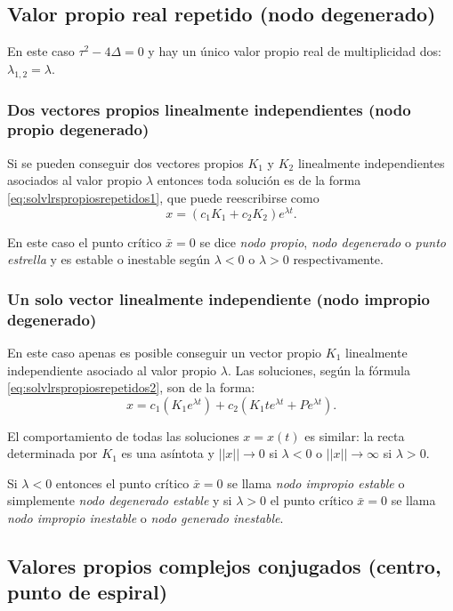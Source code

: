 \documentclass[11pt]{book}
\theoremstyle{definition}
\numberwithin{definition}{section}
\theoremstyle{theorem}
\numberwithin{theorem}{section}
\numberwithin{lemma}{section}
\numberwithin{corollary}{section}
\theoremstyle{plain}
\numberwithin{example}{section}
\begin{document}

\subsection{Valor propio real repetido (nodo degenerado)}

En este caso $\tau^2 - 4\Delta = 0$ y hay un único valor propio real de multiplicidad dos: $\lambda_{1,2} = \lambda$.

\subsubsection{Dos vectores propios linealmente independientes (nodo propio degenerado)}

Si se pueden conseguir dos vectores propios $K_1$ y $K_2$ linealmente independientes asociados al valor propio $\lambda$ entonces toda solución es de la forma \ref{eq:solvlrspropiosrepetidos1}, que puede reescribirse como
$$ x = (c_1K_1 + c_2K_2)e^{\lambda t}.$$

En este caso el punto crítico $\bar{x} = 0$ se dice \emph{nodo propio}, \emph{nodo degenerado} o \emph{punto estrella} y es estable o inestable según $\lambda < 0$ o $\lambda > 0$ respectivamente.


\subsubsection{Un solo vector linealmente independiente (nodo impropio degenerado)}

En este caso apenas es posible conseguir un vector propio $K_1$ linealmente independiente asociado al valor propio $\lambda$. Las soluciones, según la fórmula \ref{eq:solvlrspropiosrepetidos2}, son de la forma:
$$ x =c_1(K_1 e^{\lambda t}) + c_2(K_1 t e^{\lambda t} + Pe^{\lambda t}). $$

El comportamiento de todas las soluciones $x = x(t)$ es similar: la recta determinada por $K_1$ es una asíntota y $||x|| \to 0$ si $\lambda < 0$ o $||x|| \to \infty$ si $\lambda > 0$.

Si $\lambda < 0$ entonces el punto crítico $\bar{x} = 0$ se llama \emph{nodo impropio estable} o simplemente \emph{nodo degenerado estable} y si $\lambda > 0$ el punto crítico $\bar{x} = 0$ se llama \emph{nodo impropio inestable} o \emph{nodo generado inestable}.


\subsection{Valores propios complejos conjugados (centro, punto de espiral)}
\end{document}
